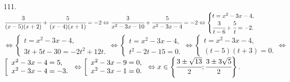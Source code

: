 111. $\cfrac{3}{(x-5)(x+2)}+\cfrac{5}{(x-4)(x+1)}=-2\Leftrightarrow
\cfrac{3}{x^2-3x-10}+\cfrac{5}{x^2-3x-4}=-2\Leftrightarrow\begin{cases} t=x^2-3x-4,\\ \cfrac{3}{t-6}+\cfrac{5}{t}=-2.\end{cases}$\\
$\Leftrightarrow\begin{cases} t=x^2-3x-4,\\ 3t+5t-30=-2t^2+12t.\end{cases}
\Leftrightarrow\begin{cases} t=x^2-3x-4,\\ t^2-2t-15=0.\end{cases}
\Leftrightarrow\begin{cases} t=x^2-3x-4,\\ (t-5)(t+3)=0.\end{cases}
\Leftrightarrow$\\$\left[\begin{array}{l}x^2-3x-4=5,\\ x^2-3x-4=-3.\end{array}\right.
\Leftrightarrow\left[\begin{array}{l}x^2-3x-9=0,\\ x^2-3x-1=0.\end{array}\right.
\Leftrightarrow x\in\left\{\cfrac{3\pm\sqrt{13}}{2}; \cfrac{3\pm3\sqrt{5}}{2}\right\}.$\\
